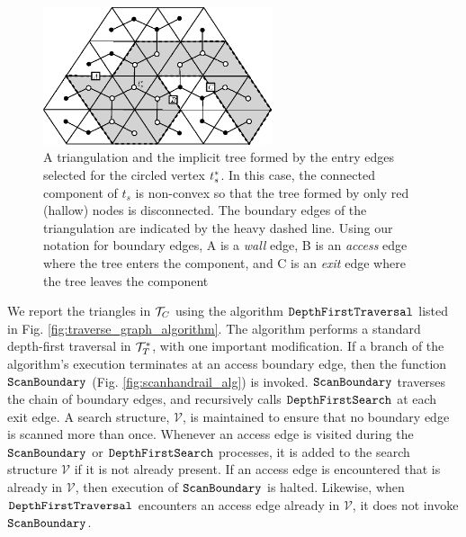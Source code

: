 {  \begin{figure}[th]
	  \centering
		  \includegraphics[width=0.6\textwidth]{Fig9}
	  \caption[Boundary edge definitions]{A triangulation and the implicit tree 
	  formed by the entry edges selected for the circled vertex $t^*_s$. 
	  In this case, the connected component of $t_s$ is non-convex so that the tree 
	  formed by only red (hallow) nodes is disconnected. 
	  The boundary edges of the triangulation are indicated by the heavy dashed 
	  line. 
	  Using our notation for boundary edges, A is a \emph{wall} edge, B is an 
	  \emph{access} edge where the tree enters the component, and C is an 
	  \emph{exit} edge where the tree leaves the component}
	  \label{fig:imp_tree_non-convex}
  \end{figure}

  We report the triangles in ${\mathcal{T}}_C$ using the algorithm 
  $\texttt{DepthFirstTraversal}$ listed in Fig. \ref{fig:traverse_graph_algorithm}.
  The algorithm performs a standard depth-first traversal in 
  $\mathcal{T}^*_T$, with one important modification. 
  If a branch of the algorithm's execution terminates at an access boundary 
  edge, then the function $\texttt{ScanBoundary}$ (Fig. \ref{fig:scanhandrail_alg}) 
  is invoked. 
  $\texttt{ScanBoundary}$ traverses the chain of boundary edges, and recursively calls 
  $\texttt{DepthFirstSearch}$ at each exit edge. 
  A search structure, $\mathcal{V}$, is maintained to ensure that no boundary edge is 
  scanned more than once.  
  Whenever an access edge is visited during the $\texttt{ScanBoundary}$ 
  or $\texttt{DepthFirstSearch}$ 
  processes, it is added to the search structure $\mathcal{V}$ if it is not already 
  present. 
  If an access edge is encountered that is already in $\mathcal{V}$, then execution 
  of $\texttt{ScanBoundary}$ is halted. 
  Likewise, when $\texttt{DepthFirstTraversal}$ encounters an access edge already in 
  $\mathcal{V}$, it does not invoke $\texttt{ScanBoundary}$. 

  \begin{figure}[h]
  \protect {}
\end{figure}}
